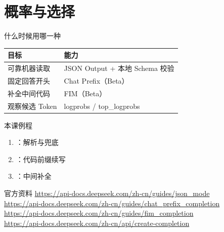 \documentclass[aspectratio=169,UTF8]{ctexbeamer}
\begin{document}
\section{概率与选择}
\begin{frame}{什么时候用哪一种}
\begin{tabular}{ll}
\toprule
目标 & 能力\\
\midrule
可靠机器读取 & JSON Output + 本地 Schema 校验\\
固定回答开头 & Chat Prefix（Beta）\\
补全中间代码 & FIM（Beta）\\
观察候选 Token & logprobs / top\_logprobs\\
\bottomrule
\end{tabular}
\end{frame}
\begin{frame}{本课例程}
\begin{enumerate}
  \item {}：解析与兜底
  \item {}：代码前缀续写
  \item {}：中间补全
\end{enumerate}
\end{frame}
\begin{frame}{官方资料}
\small
\url{https://api-docs.deepseek.com/zh-cn/guides/json_mode}\\
\url{https://api-docs.deepseek.com/zh-cn/guides/chat_prefix_completion}\\
\url{https://api-docs.deepseek.com/zh-cn/guides/fim_completion}\\
\url{https://api-docs.deepseek.com/zh-cn/api/create-completion}
\end{frame}
\end{document}
